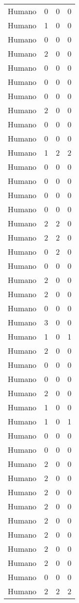 \begin{footnotesize}
\begin{longtable}{llll}
	Humano & 0 & 0 & 0 \\
	Humano & 1 & 0 & 0 \\
	Humano & 0 & 0 & 0 \\
	Humano & 2 & 0 & 0 \\
	Humano & 0 & 0 & 0 \\
	Humano & 0 & 0 & 0 \\
	Humano & 0 & 0 & 0 \\
	Humano & 2 & 0 & 0 \\
	Humano & 0 & 0 & 0 \\
	Humano & 0 & 0 & 0 \\
	Humano & 1 & 2 & 2 \\
	Humano & 0 & 0 & 0 \\
	Humano & 0 & 0 & 0 \\
	Humano & 0 & 0 & 0 \\
	Humano & 0 & 0 & 0 \\
	Humano & 2 & 2 & 0 \\
	Humano & 2 & 2 & 0 \\
	Humano & 0 & 2 & 0 \\
	Humano & 0 & 0 & 0 \\
	Humano & 2 & 0 & 0 \\
	Humano & 2 & 0 & 0 \\
	Humano & 0 & 0 & 0 \\
	Humano & 3 & 0 & 0 \\
	Humano & 1 & 0 & 1 \\
	Humano & 2 & 0 & 0 \\
	Humano & 0 & 0 & 0 \\
	Humano & 0 & 0 & 0 \\
	Humano & 2 & 0 & 0 \\
	Humano & 1 & 0 & 0 \\
	Humano & 1 & 0 & 1 \\
	Humano & 0 & 0 & 0 \\
	Humano & 0 & 0 & 0 \\
	Humano & 2 & 0 & 0 \\
	Humano & 2 & 0 & 0 \\
	Humano & 2 & 0 & 0 \\
	Humano & 2 & 0 & 0 \\
	Humano & 2 & 0 & 0 \\
	Humano & 2 & 0 & 0 \\
	Humano & 2 & 0 & 0 \\
	Humano & 2 & 0 & 0 \\
	Humano & 0 & 0 & 0 \\
	Humano & 2 & 2 & 2 \\

\end{longtable}
\end{footnotesize}
